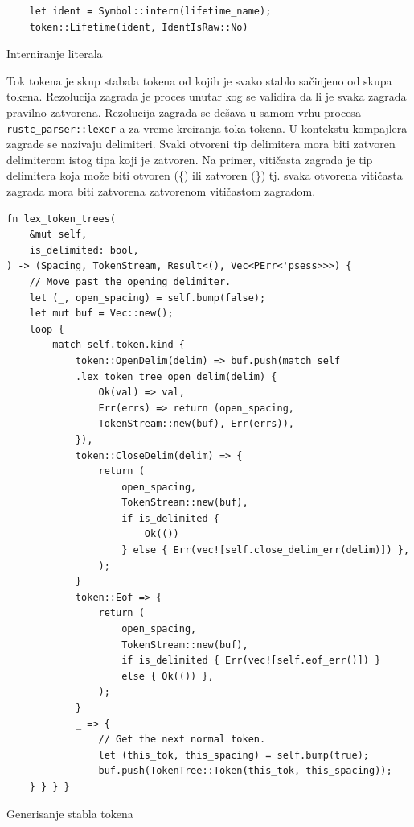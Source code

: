 \documentclass[11pt]{article}
\begin{document}
\begin{listing}[H]
\begin{verbatim}
    let ident = Symbol::intern(lifetime_name);
    token::Lifetime(ident, IdentIsRaw::No)
\end{verbatim}
\caption{Interniranje literala}
\label{lst:intern}
\end{listing}
Tok tokena je skup stabala tokena od kojih je svako stablo sačinjeno od skupa tokena.  
Rezolucija zagrada je proces unutar kog se validira da li je svaka zagrada pravilno zatvorena.
Rezolucija zagrada se dešava u samom vrhu procesa \verb|rustc_parser::lexer|-a 
za vreme kreiranja toka tokena. U kontekstu kompajlera zagrade se nazivaju delimiteri. 
Svaki otvoreni tip delimitera mora biti zatvoren delimiterom istog tipa koji je zatvoren.
Na primer, vitičasta zagrada je tip delimitera koja može biti otvoren (\{) ili zatvoren (\}) tj.
svaka otvorena vitičasta zagrada mora biti zatvorena zatvorenom vitičastom zagradom.

\begin{listing}[H]
\begin{verbatim}
fn lex_token_trees(
    &mut self,
    is_delimited: bool,
) -> (Spacing, TokenStream, Result<(), Vec<PErr<'psess>>>) {
    // Move past the opening delimiter.
    let (_, open_spacing) = self.bump(false);
    let mut buf = Vec::new();
    loop {
        match self.token.kind {
            token::OpenDelim(delim) => buf.push(match self
            .lex_token_tree_open_delim(delim) {
                Ok(val) => val,
                Err(errs) => return (open_spacing, 
                TokenStream::new(buf), Err(errs)),
            }),
            token::CloseDelim(delim) => {
                return (
                    open_spacing,
                    TokenStream::new(buf),
                    if is_delimited { 
                        Ok(()) 
                    } else { Err(vec![self.close_delim_err(delim)]) },
                );
            }
            token::Eof => {
                return (
                    open_spacing,
                    TokenStream::new(buf),
                    if is_delimited { Err(vec![self.eof_err()]) } 
                    else { Ok(()) },
                );
            }
            _ => {
                // Get the next normal token.
                let (this_tok, this_spacing) = self.bump(true);
                buf.push(TokenTree::Token(this_tok, this_spacing));
    } } } }
\end{verbatim}
\caption{Generisanje stabla tokena}
\end{listing}
\end{document}
